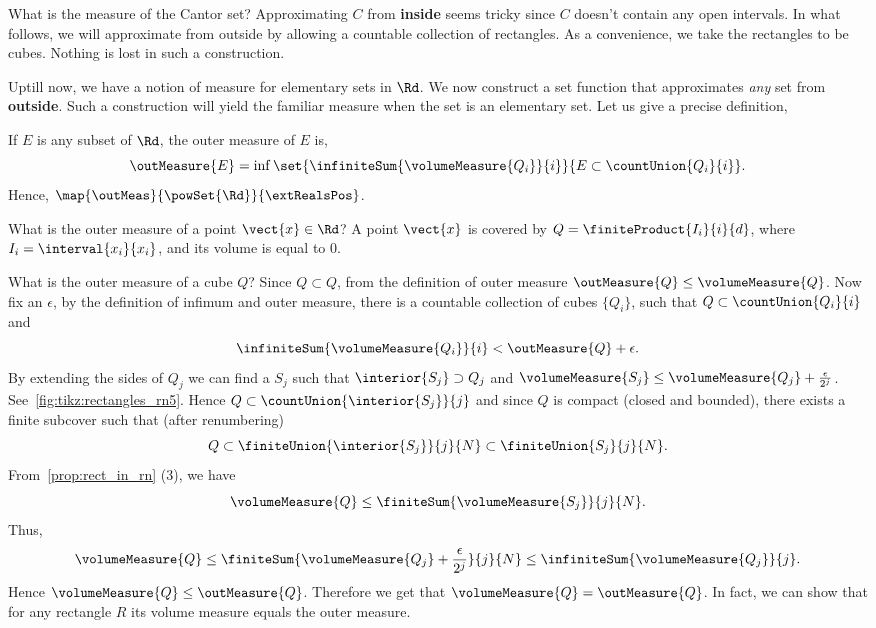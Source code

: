 What is the measure of the Cantor set? Approximating $C$ from \textbf{inside} seems tricky since $C$ doesn't
contain any open intervals. In what follows, we will approximate from outside by allowing a countable
collection of rectangles. As a convenience, we take the rectangles to be cubes. Nothing is lost in such a
construction.

Uptill now, we have a notion of measure for elementary sets in $\Rd$. We now construct a set function that
approximates \emph{any} set from \textbf{outside}. Such a construction will yield the familiar measure when
the set is an elementary set. Let us give a precise definition,
\begin{Definition}[name=Outer (volume) measure]
    If $E$ is any subset of $\Rd$, the outer measure of $E$ is,
    \[\outMeasure{E} = \inf\set{\infiniteSum{\volumeMeasure{Q_i}}{i}}{E\subset\countUnion{Q_i}{i}}.\]
    Hence,
    $\map{\outMeas}{\powSet{\Rd}}{\extRealsPos}$.
\end{Definition}
\begin{Example}
    What is the outer measure of a point $\vect{x}\in\Rd$? A point $\vect{x}$ is covered by $Q =
    \finiteProduct{I_i}{i}{d}$,
    where $I_i = \interval{x_i}{x_i}$, and its volume is equal to $0$.
\end{Example}
\begin{Example}
    What is the outer measure of a cube $Q$? Since $Q \subset Q$, from the definition of outer measure
    $\outMeasure{Q} \leq \volumeMeasure{Q}$. Now fix an $\epsilon$, by the definition of infimum and outer
    measure, there is a
    countable collection of cubes $\lbrace Q_i \rbrace$, such that $Q \subset \countUnion{Q_i}{i}$ and
    \[\infiniteSum{\volumeMeasure{Q_i}}{i} < \outMeasure{Q} + \epsilon.\]
    By extending the sides of $Q_j$ we can find a $S_j$ such that $\interior{S_j}\supset Q_j$ and
    $\volumeMeasure{S_j} \leq \volumeMeasure{Q_j} + \frac{\epsilon}{2^j}$. See~\ref{fig:tikz:rectangles_rn5}.
    Hence $Q \subset
    \countUnion{\interior{S_j}}{j}$ and since $Q$ is compact (closed and bounded), there exists a finite
    subcover such that (after renumbering)
    \[Q \subset \finiteUnion{\interior{S_j}}{j}{N} \subset \finiteUnion{S_j}{j}{N}.\]
    From~\ref{prop:rect_in_rn} (3), we have
    \[\volumeMeasure{Q} \leq \finiteSum{\volumeMeasure{S_j}}{j}{N}.\]
    Thus,
    \[\volumeMeasure{Q} \leq \finiteSum{\volumeMeasure{Q_j}+\frac{\epsilon}{2^j}}{j}{N} \leq
	\infiniteSum{\volumeMeasure{Q_j}}{j}.\]
    Hence $\volumeMeasure{Q} \leq \outMeasure{Q}$. Therefore we get that $\volumeMeasure{Q} =
    \outMeasure{Q}$. In fact, we can show that for any rectangle $R$ its volume measure equals the outer
    measure.
\end{Example}

